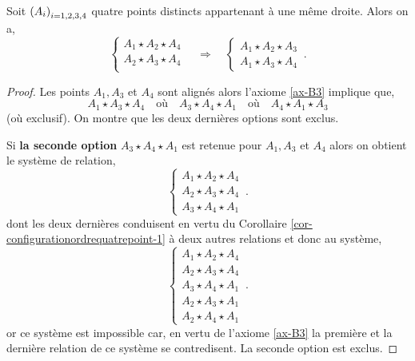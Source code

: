 \begin{cor}\label{cor-configurationordrequatrepoint-2}
Soit $\left(A_{i}\right)_{i = 1,2,3,4}$ quatre points distincts appartenant à une même droite. Alors on a,
        \begin{equation*}
        \left\{
            \begin{array}{c}
                 A_{1} \star A_{2} \star A_{4} \\
                 A_{2} \star A_{3} \star A_{4}\\
            \end{array}
            \right. \quad \Longrightarrow \quad \left\{
            \begin{array}{c}
                A_1 \star A_2 \star A_3\\
                A_1 \star A_3 \star A_4
            \end{array}
            \right.\,.
    \end{equation*}
    \begin{proof}
        Les points $A_1,A_3$ et $A_4$ sont alignés alors l'axiome \ref{ax-B3} implique que,
        \begin{equation*}
            A_1 \star A_3 \star A_4 \quad\text{où}\quad A_3 \star A_4 \star A_1 \quad\text{où}\quad A_4 \star A_1 \star A_3 
        \end{equation*}
        (où exclusif). On montre que les deux dernières options sont exclus. 

        Si \textbf{la seconde option} $A_3 \star A_4 \star A_1$ est retenue pour $A_1,A_3$ et $A_4$ alors on obtient le système de relation,
        \begin{equation*}
        \left\{
            \begin{array}{c}
                 A_1 \star A_2 \star A_4 \\
                 A_2 \star A_3 \star A_4 \\
                 A_3 \star A_4 \star A_1 
            \end{array}
            \right. \,.
        \end{equation*}
        dont les deux dernières conduisent en vertu du Corollaire \ref{cor-configurationordrequatrepoint-1} à deux autres relations et donc au système,
        \begin{equation*}
        \left\{
            \begin{array}{c}
                 A_1 \star A_2 \star A_4 \\
                 A_2 \star A_3 \star A_4 \\
                 A_3 \star A_4 \star A_1 \\
                 A_2 \star A_3 \star A_1 \\
                 A_2 \star A_4 \star A_1 
            \end{array}
            \right. \,.
        \end{equation*}
        or ce système est impossible car, en vertu de l'axiome \ref{ax-B3} la première et la dernière relation de ce système se contredisent. La seconde option est exclus.


\end{proof}
\end{cor}
